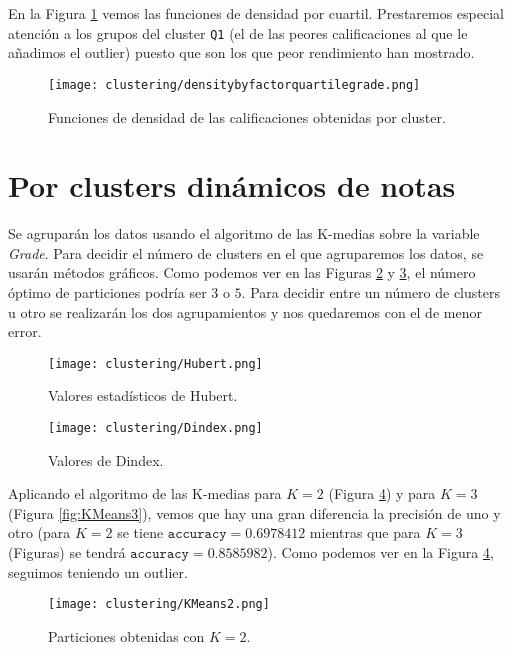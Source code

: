 En la Figura \ref{fig:densitybyfactorquartilegrade} vemos las funciones de densidad por cuartil. Prestaremos especial atención a los grupos del cluster \texttt{Q1} (el de las peores calificaciones al que le añadimos el outlier) puesto que son los que peor rendimiento han mostrado.

\begin{figure}[H]
    \centering
    \texttt{[image: clustering/densitybyfactorquartilegrade.png]}
    \caption{Funciones de densidad de las calificaciones obtenidas por cluster.}
    \label{fig:densitybyfactorquartilegrade}
\end{figure}

\section{Por clusters dinámicos de notas}

Se agruparán los datos usando el algoritmo de las K-medias sobre la variable \emph{Grade}. Para decidir el número de clusters en el que agruparemos los datos, se usarán métodos gráficos. Como podemos ver en las Figuras \ref{fig:indiceshubert} y \ref{fig:indicesdindex}, el número óptimo de particiones podría ser $3$ o $5$. Para decidir entre un número de clusters u otro se realizarán los dos agrupamientos y nos quedaremos con el de menor error.

\begin{figure}[H]
    \centering
    \texttt{[image: clustering/Hubert.png]}
    \caption{Valores estadísticos de Hubert.}
    \label{fig:indiceshubert}
\end{figure}

\begin{figure}[H]
    \centering
    \texttt{[image: clustering/Dindex.png]}
    \caption{Valores de Dindex.}
    \label{fig:indicesdindex}
\end{figure}

Aplicando el algoritmo de las K-medias para $K = 2$ (Figura \ref{fig:KMeans2}) y para $K = 3$ (Figura \ref{fig:KMeans3}), vemos que hay una gran diferencia la precisión de uno y otro (para $K = 2$ se tiene $\texttt{accuracy} = 0.6978412$ mientras que para $K = 3$ (Figuras) se tendrá $\texttt{accuracy} = 0.8585982$). Como podemos ver en la Figura \ref{fig:KMeans2}, seguimos teniendo un outlier.

\begin{figure}[H]
    \centering
    \texttt{[image: clustering/KMeans2.png]}
    \caption{Particiones obtenidas con $K = 2$.}
    \label{fig:KMeans2}
\end{figure}

